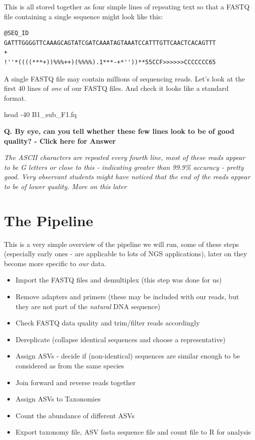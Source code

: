 \documentclass[
]{book}
\newenvironment{Shaded}{\begin{snugshade}}{\end{snugshade}}
\newcommand{\AttributeTok}[1]{\textcolor[rgb]{0.77,0.63,0.00}{#1}}
\newcommand{\FunctionTok}[1]{\textcolor[rgb]{0.00,0.00,0.00}{#1}}
\newcommand{\NormalTok}[1]{#1}
\begin{document}
This is all stored together as four simple lines of repeating text so that a FASTQ file containing a single sequence might look like this:

\begin{verbatim}
@SEQ_ID
GATTTGGGGTTCAAAGCAGTATCGATCAAATAGTAAATCCATTTGTTCAACTCACAGTTT
+
!''*((((***+))%%%++)(%%%%).1***-+*''))**55CCF>>>>>>CCCCCCC65
\end{verbatim}

A single FASTQ file may contain millions of sequencing reads. Let's look at the first 40 lines of \emph{one} of our FASTQ files. And check it looks like a standard format.

\begin{Shaded}
\begin{Highlighting}[]
\FunctionTok{head} \AttributeTok{{-}40}\NormalTok{ B1\_sub\_F1.fq}
\end{Highlighting}
\end{Shaded}

\textbf{Q. By eye, can you tell whether these few lines look to be of good quality? - Click here for Answer}

\emph{The ASCII characters are repeated every fourth line, most of these reads appear to be G letters or close to this - indicating greater than 99.9\% accuracy - pretty good. Very observant students might have noticed that the end of the reads appear to be of lower quality. More on this later}

\hypertarget{the-pipeline}{%
\section{The Pipeline}\label{the-pipeline}}

This is a very simple overview of the pipeline we will run, some of these steps (especially early ones - are applicable to lots of NGS applications), later on they become more specific to \emph{our} data.

\begin{itemize}
\item
  Import the FASTQ files and demultiplex (this step was done for us)
\item
  Remove adapters and primers (these may be included with our reads, but they are not part of the \emph{natural} DNA sequence)
\item
  Check FASTQ data quality and trim/filter reads accordingly
\item
  Dereplicate (collapse identical sequences and choose a representative)
\item
  Assign ASVs - decide if (non-identical) sequences are similar enough to be considered as from the same species
\item
  Join forward and reverse reads together
\item
  Assign ASVs to Taxonomies
\item
  Count the abundance of different ASVs
\item
  Export taxonomy file, ASV fasta sequence file and count file to R for analysis
\end{itemize}
\end{document}
